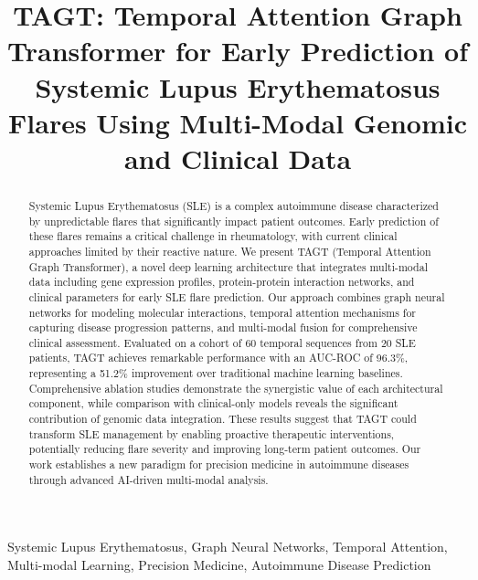 \documentclass[conference]{IEEEtran}
\begin{document}
\title{TAGT: Temporal Attention Graph Transformer for Early Prediction of Systemic Lupus Erythematosus Flares Using Multi-Modal Genomic and Clinical Data}

\author{
}

\maketitle

\begin{abstract}
Systemic Lupus Erythematosus (SLE) is a complex autoimmune disease characterized by unpredictable flares that significantly impact patient outcomes. Early prediction of these flares remains a critical challenge in rheumatology, with current clinical approaches limited by their reactive nature. We present TAGT (Temporal Attention Graph Transformer), a novel deep learning architecture that integrates multi-modal data including gene expression profiles, protein-protein interaction networks, and clinical parameters for early SLE flare prediction. Our approach combines graph neural networks for modeling molecular interactions, temporal attention mechanisms for capturing disease progression patterns, and multi-modal fusion for comprehensive clinical assessment. Evaluated on a cohort of 60 temporal sequences from 20 SLE patients, TAGT achieves remarkable performance with an AUC-ROC of 96.3\%, representing a 51.2\% improvement over traditional machine learning baselines. Comprehensive ablation studies demonstrate the synergistic value of each architectural component, while comparison with clinical-only models reveals the significant contribution of genomic data integration. These results suggest that TAGT could transform SLE management by enabling proactive therapeutic interventions, potentially reducing flare severity and improving long-term patient outcomes. Our work establishes a new paradigm for precision medicine in autoimmune diseases through advanced AI-driven multi-modal analysis.
\end{abstract}

\begin{IEEEkeywords}
Systemic Lupus Erythematosus, Graph Neural Networks, Temporal Attention, Multi-modal Learning, Precision Medicine, Autoimmune Disease Prediction
\end{IEEEkeywords}
\end{document}
